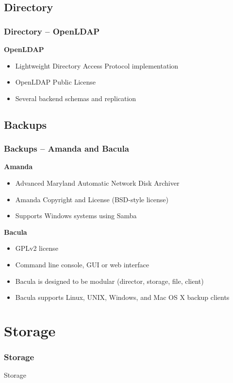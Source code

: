\documentclass{beamer}
\begin{document}
  \subsection{Directory}
  \begin{frame}
    \frametitle{Directory -- OpenLDAP}
    \textbf{OpenLDAP}
    \begin{itemize}
      \item Lightweight Directory Access Protocol implementation
      \item OpenLDAP Public License
      \item Several backend schemas and replication
    \end{itemize}
  \end{frame}

  \subsection{Backups}
  \begin{frame}
    \frametitle{Backups -- Amanda and Bacula}
    \textbf{Amanda}
    \begin{itemize}
      \item Advanced Maryland Automatic Network Disk Archiver
      \item Amanda Copyright and License (BSD-style license)
      \item Supports Windows systems using Samba
    \end{itemize}
    \textbf{Bacula}
    \begin{itemize}
      \item GPLv2 license
      \item Command line console, GUI or web interface
      \item Bacula is designed to be modular (director, storage, file, client)
      \item Bacula supports Linux, UNIX, Windows, and Mac OS X backup clients
    \end{itemize}
  \end{frame}


\section{Storage}

\begin{frame}
  \frametitle{Storage}
  \begin{center}
    \Huge Storage
  \end{center}
\end{frame}
\end{document}
